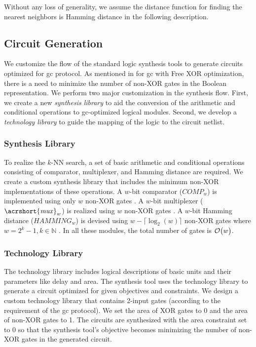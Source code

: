 Without any loss of generality, we assume the distance function for finding the nearest neighbors is Hamming distance in the following description.

\subsection{Circuit Generation}\label{ssec:knn-circuitgen}
We customize the flow of the standard logic synthesis tools to generate circuits optimized for \acrshort{gc} protocol.
As mentioned in  for \acrshort{gc} with Free XOR optimization, there is a need to minimize the number of non-XOR gates in the Boolean representation.
We perform two major customization in the synthesis flow.
First, we create a new \emph{synthesis library} to aid the conversion of the arithmetic and conditional operations to \acrshort{gc}-optimized logical modules.
Second, we develop a \emph{technology library} to guide the mapping of the logic to the circuit netlist.

\subsubsection{Synthesis Library}
To realize the $k$-NN search, a set of basic arithmetic and conditional operations consisting of comparator, multiplexer, and Hamming distance are required.
We create a custom synthesis library that includes the minimum non-XOR implementations of these operations.
A $w$-bit comparator ($\mathit{COMP}_w$) is implemented using only $w$ non-XOR gates \cite{kolesnikov2009improved}.
A $w$-bit multiplexer ($\mathit{\acrshort{mux}}_w$) is realized using $w$ non-XOR gates \cite{kolesnikov2008improved}.
A $w$-bit Hamming distance ($\mathit{HAMMING}_w$) is devised using $w-\lceil \log _2(w) \rceil$ non-XOR gates where $w=2^k-1, k \in \mathbb{N}$ \cite{boyar2006concrete}.
In all these modules, the total number of gates is $\mathcal{O}\bigl(w\bigr)$.

\subsubsection{Technology Library}
The technology library includes logical descriptions of basic units and their parameters like delay and area.
The synthesis tool uses the technology library to generate a circuit optimized for given objectives and constraints.
We design a custom technology library that contains 2-input gates (according to the requirement of the \acrshort{gc} protocol).
We set the area of XOR gates to 0 and the area of non-XOR gates to 1.
The circuits are synthesized with the area constraint set to 0 so that the synthesis tool's objective becomes minimizing the number of non-XOR gates in the generated circuit.

